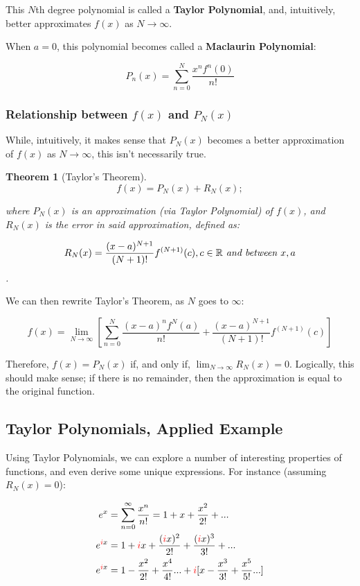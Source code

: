 \documentclass[12pt]{article}
\newtheorem{theorem}{Theorem}
\begin{document}
This $N$th degree polynomial is called a \textbf{Taylor Polynomial}, and, intuitively, better approximates $f(x)$ as $N \to \infty$.

When $a = 0$, this polynomial becomes called a \textbf{Maclaurin Polynomial}:

$$P_n(x) = \sum_{n=0}^{N} \frac{x^n f^n(0)}{n!}$$

\subsubsection{Relationship between \texorpdfstring{$f(x)$}{a function} and \texorpdfstring{$P_N(x)$}{its approximation}}

While, intuitively, it makes sense that $P_N(x)$ becomes a better approximation of $f(x)$ as $N\to\infty$, this isn't necessarily true.

\begin{theorem}[Taylor's Theorem]
$$f(x) = P_N(x) + R_N(x);$$

where $P_N(x)$ is an approximation (via Taylor Polynomial) of $f(x)$, and $R_N(x)$ is the error in said approximation, defined as:

$$R_N(x) = \frac{(x-a)^{N+1}}{(N+1)!}f^{(N+1)}(c), c \in \mathbb{R} \textit{ and between } x, a$$.
\end{theorem}

We can then rewrite Taylor's Theorem, as $N$ goes to $\infty$:

$$f(x) = \lim_{N\to\infty}[\sum_{n=0}^N \frac{(x-a)^n f^{N}(a)}{n!} + \frac{(x-a)^{N+1}}{(N+1)!} f^{(N+1)}(c)]$$

Therefore, $f(x) = P_N(x)$ if, and only if, $\lim_{N\to\infty} R_N(x) = 0$. Logically, this should make sense; if there is no remainder, then the approximation is equal to the original function.

\subsection{Taylor Polynomials, Applied Example}\label{sec:taylorcomplex}

Using Taylor Polynomials, we can explore a number of interesting properties of functions, and even derive some unique expressions. For instance (assuming $R_N(x) = 0$):

\begin{equation}\label{eqn:taylorexp}
    \begin{split}
    e^x &= \sum_{n=0}^{\infty} \frac{x^n}{n!} = 1 + x + \frac{x^2}{2!} + ...\\
    e^{\textcolor{red}{i}x} &= 1 + \textcolor{red}{i}x + \frac{(\textcolor{red}{i}x)^2}{2!} + \frac{(\textcolor{red}{i}x)^3}{3!} + ...\\
    e^{\textcolor{red}{i}x} &= 1 -\frac{x^2}{2!} + \frac{x^4}{4!}...+\textcolor{red}{i}[x - \frac{x^3}{3!} + \frac{x^5}{5!}...]\\
    \end{split}
\end{equation}
\end{document}
